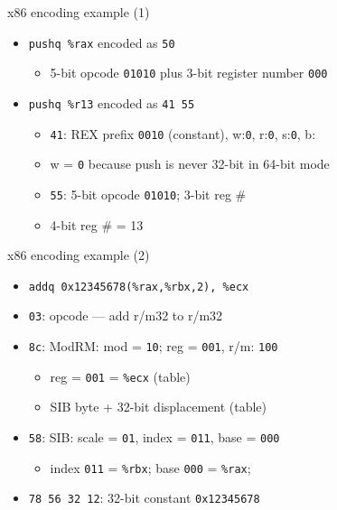 
\begin{frame}[fragile,label=x86ex1]{x86 encoding example (1)}
    \begin{itemize}
    \item \lstinline|pushq %rax| encoded as {\tt 50}
        \begin{itemize}
        \item 5-bit opcode {\tt 01010} plus 3-bit register number {\tt 000}
        \end{itemize}
    \item \lstinline|pushq %r13| encoded as {\tt 41 55}
        \begin{itemize}
        \item {\tt 41}: REX prefix {\tt 0010} (constant), w:{\tt 0}, r:{\tt 0}, s:{\tt 0}, b:{\tt \color{blue!80!black}{1}}
        \item w = {\tt 0} because push is never 32-bit in 64-bit mode
        \item {\tt 55}: 5-bit opcode {\tt 01010}; 3-bit reg \# {\tt \color{green!80!black}{101}}
        \item 4-bit reg \# {\tt \color{blue!80!black}{1}\color{green!80!black}{101}} = 13
        \end{itemize}
    \end{itemize}
\end{frame}

\begin{frame}[fragile,label=x86ex2]{x86 encoding example (2)}
    \begin{itemize}
    \item \lstinline|addq 0x12345678(%rax,%rbx,2), %ecx|
    \item {\tt 03}: opcode --- add r/m32 to r/m32
    \item {\tt 8c}: ModRM: mod = {\tt 10}; reg = {\tt 001}, r/m: {\tt 100}
        \begin{itemize}
        \item reg = {\tt 001} = {\tt \%ecx} (table)
        \item SIB byte + 32-bit displacement (table)
        \end{itemize}
    \item {\tt 58}: SIB: scale = {\tt 01}, index = {\tt 011}, base = {\tt 000}
        \begin{itemize}
        \item index {\tt 011} = {\tt \%rbx}; base {\tt 000} = {\tt \%rax};
        \end{itemize}
    \item {\tt 78 56 32 12}: 32-bit constant {\tt 0x12345678}
    \end{itemize}
\end{frame}

